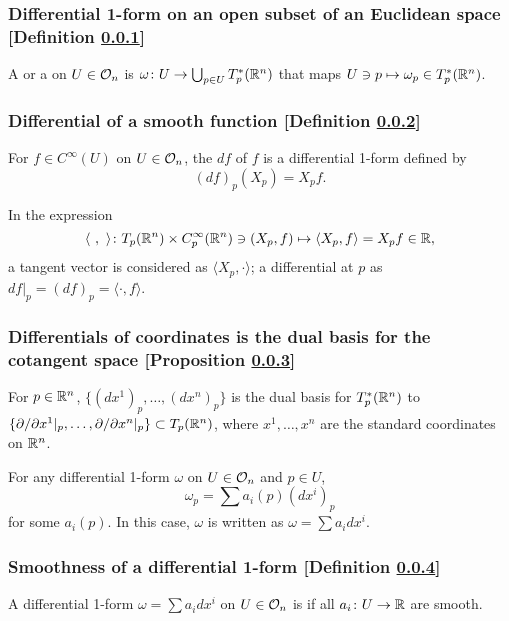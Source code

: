 \subsubsection{Differential 1-form on an open subset of an Euclidean space [Definition \ref{differential-1-form-on-an-open-subset-of-an-euclidean-space}]}\label{differential-1-form-on-an-open-subset-of-an-euclidean-space}
A  or a  on $U \in \mathcal{O}_{n}$ is $\omega \colon U \to \bigcup_{p \in U} T^*_p (\mathbb{R}^n)$ that maps $U \ni p \mapsto \omega_p \in T^*_p (\mathbb{R}^n)$.

\subsubsection{Differential of a smooth function [Definition \ref{differential-of-a-smooth-function}]}\label{differential-of-a-smooth-function}
For $f \in C^\infty (U)$ on $U \in \mathcal{O}_{n}$, the  $df$ of $f$ is a differential 1-form defined by
\[
(df)_p (X_p) = X_p f.
\]


In the expression
\[
\langle \ ,\  \rangle \colon T_p(\mathbb{R}^n) \times C^\infty_p (\mathbb{R}^n) \ni (X_p, f) \mapsto \langle X_p, f \rangle = X_p f \in \mathbb{R},
\]
a tangent vector is considered as $\langle X_p, \cdot \rangle$; a differential at $p$ as $df|_p = (df)_p = \langle \cdot, f \rangle$.


\subsubsection{Differentials of coordinates is the dual basis for the cotangent space [Proposition \ref{differentials-of-the-coordinates-is-the-dual-basis-for-the-cotangent-space}]}\label{differentials-of-the-coordinates-is-the-dual-basis-for-the-cotangent-space}
For $p \in \mathbb{R}^n$, $\{ (dx^1)_p, \dotsc, (dx^n)_p \} $ is the dual basis for $T_p^* (\mathbb{R}^n)$ to $\{ \partial / \partial x^1|_p, \dotsc, \partial/\partial x^n|_p \} \subset T_p (\mathbb{R}^n)$, where $x^1, \dotsc, x^n$ are the standard coordinates on $\mathbb{R}^n$.

For any differential 1-form $\omega$ on $U \in \mathcal{O}_{n}$ and $p \in U$,
\[
\omega_p = \sum a_i(p) (dx^i)_p
\]
for some $a_i (p)$. In this case, $\omega$ is written as $\omega = \sum a_i dx^i$.

\subsubsection{Smoothness of a differential 1-form [Definition \ref{smoothness-of-a-differential-1-form}]}\label{smoothness-of-a-differential-1-form}
A differential 1-form $\omega = \sum a_i dx^i$ on $U \in \mathcal{O}_{n}$ is  if all $a_i \colon U \to \mathbb{R}$ are smooth.

